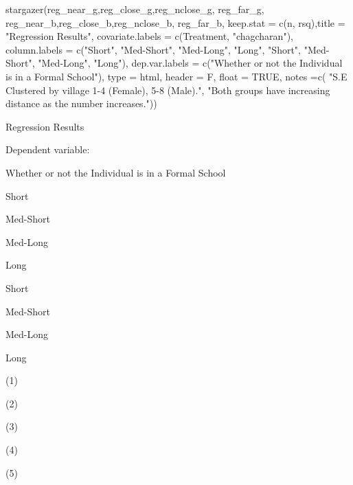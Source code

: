 \documentclass[
]{article}
\newenvironment{Shaded}{\begin{snugshade}}{\end{snugshade}}
\newcommand{\AttributeTok}[1]{\textcolor[rgb]{0.77,0.63,0.00}{#1}}
\newcommand{\ConstantTok}[1]{\textcolor[rgb]{0.00,0.00,0.00}{#1}}
\newcommand{\FunctionTok}[1]{\textcolor[rgb]{0.00,0.00,0.00}{#1}}
\newcommand{\NormalTok}[1]{#1}
\newcommand{\StringTok}[1]{\textcolor[rgb]{0.31,0.60,0.02}{#1}}
\begin{document}
\begin{Shaded}
\begin{Highlighting}[]
\FunctionTok{stargazer}\NormalTok{(reg\_near\_g,reg\_close\_g,reg\_nclose\_g, reg\_far\_g, reg\_near\_b,reg\_close\_b,reg\_nclose\_b, reg\_far\_b, }\AttributeTok{keep.stat =} \FunctionTok{c}\NormalTok{(}\StringTok{\textquotesingle{}n\textquotesingle{}}\NormalTok{, }\StringTok{\textquotesingle{}rsq\textquotesingle{}}\NormalTok{),}\AttributeTok{title =} \StringTok{"Regression Results"}\NormalTok{,}
          \AttributeTok{covariate.labels =} \FunctionTok{c}\NormalTok{(}\StringTok{\textquotesingle{}Treatment\textquotesingle{}}\NormalTok{, }\StringTok{"chagcharan"}\NormalTok{), }\AttributeTok{column.labels =} \FunctionTok{c}\NormalTok{(}\StringTok{"Short"}\NormalTok{, }\StringTok{"Med{-}Short"}\NormalTok{, }\StringTok{"Med{-}Long"}\NormalTok{, }\StringTok{"Long"}\NormalTok{, }\StringTok{"Short"}\NormalTok{, }\StringTok{"Med{-}Short"}\NormalTok{, }\StringTok{"Med{-}Long"}\NormalTok{, }\StringTok{"Long"}\NormalTok{),}
          \AttributeTok{dep.var.labels =} \FunctionTok{c}\NormalTok{(}\StringTok{"Whether or not the Individual is in a Formal School"}\NormalTok{), }
          \AttributeTok{type =} \StringTok{\textquotesingle{}html\textquotesingle{}}\NormalTok{, }\AttributeTok{header =}\NormalTok{ F, }\AttributeTok{float =} \ConstantTok{TRUE}\NormalTok{,  }\AttributeTok{notes =}\FunctionTok{c}\NormalTok{( }\StringTok{"S.E Clustered by village 1{-}4 (Female), 5{-}8 (Male)."}\NormalTok{, }
          \StringTok{"Both groups have increasing distance as the number increases."}\NormalTok{))}
\end{Highlighting}
\end{Shaded}

Regression Results

Dependent variable:

Whether or not the Individual is in a Formal School

Short

Med-Short

Med-Long

Long

Short

Med-Short

Med-Long

Long

(1)

(2)

(3)

(4)

(5)
\end{document}
